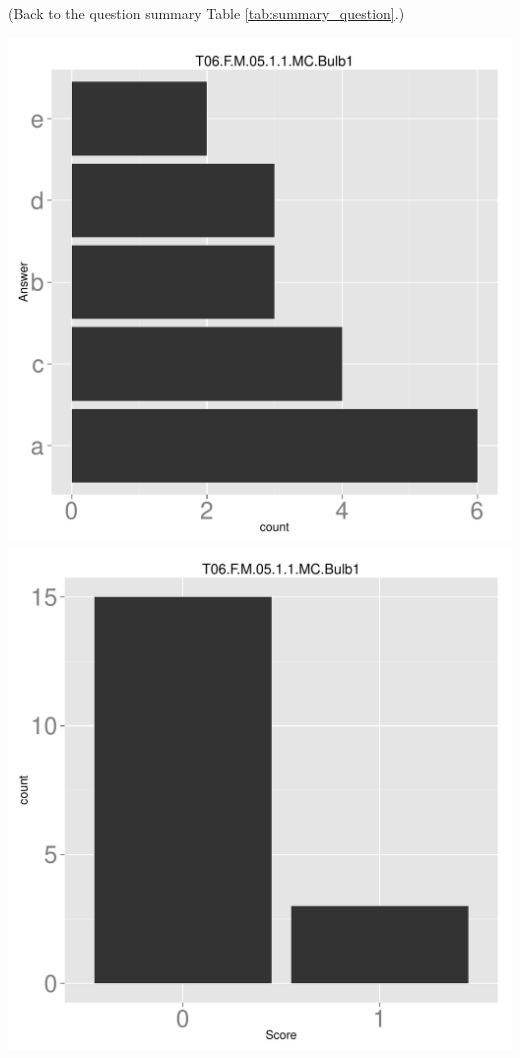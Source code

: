 \documentclass[12pt,nohyper]{tufte-handout}\usepackage[]{graphicx}\usepackage[]{color}
\begin{document}
 (Back to the question summary Table \ref{tab:summary_question}.)

\begin{center} \includegraphics[width=.45\linewidth]{Topic06_46_answer} \includegraphics[width=.45\linewidth]{Topic06_46_score} \end{center} 
\end{document}
